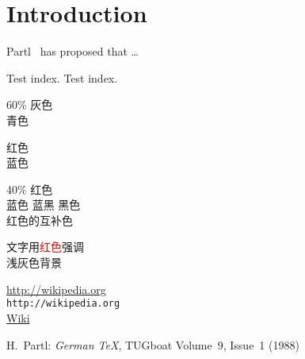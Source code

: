 \documentclass{ctexart}
\begin{document}
\section{Introduction}
Partl~\cite{germenTeX} has proposed that \ldots

Test index.
\newpage
Test index.

\large\sffamily
{\color[gray]{0.6}
60\% 灰色} \\
{\color[rgb]{0,1,1}
青色}

\large\sffamily
{\color{red} 红色} \\
{\color{blue} 蓝色}

\large\sffamily
{\color{red!40} 40\% 红色}\\
{\color{blue}蓝色
\color{blue!50!black}蓝黑
\color{black}黑色}\\
{\color{-red}红色的互补色}

\sffamily
文字用\textcolor{red}{红色}强调\\
\colorbox[gray]{0.95}{浅灰色背景} \\

\url{http://wikipedia.org} \\
\nolinkurl{http://wikipedia.org} \\
\href{http://wikipedia.org}{Wiki}

\begin{thebibliography}{99}
     H.~Partl: \emph{German \TeX},
TUGboat Volume~9, Issue~1 (1988)
\end{thebibliography}

\printindex
\end{document}
